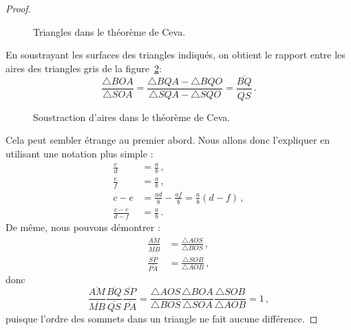 \begin{proof}
\begin{figure}[th]
\caption{Triangles dans le théorème de Ceva.}\label{f.ceva2}
\end{figure}

En soustrayant les surfaces des triangles indiqués, on obtient le rapport entre les aires des triangles gris de la figure~\ref{f.ceva3}:
\[
\frac{\triangle BOA}{\triangle SOA}=\frac{\triangle BQA - \triangle BQO}{\triangle SQA-\triangle SQO} = \frac{\overline{BQ}}{\overline{QS}}\,.
\]


\begin{figure}[htbp]
\centering

\caption{Soustraction d'aires dans le théorème de Ceva.}\label{f.ceva3}
\end{figure}

Cela peut sembler étrange au premier abord. Nous allons donc l'expliquer en utilisant une notation plus simple :
\begin{align*}
 \frac{c}{d} &=\frac{a}{b}\,,\\
 \frac{e}{f} &=\frac{a}{b}\,,\\
c-e &= \frac{ad}{b} - \frac{af}{b}=\frac{a}{b}(d-f)\,,\\
\frac{c-e}{d-f} &= \frac{a}{b}\,.
\end{align*}
De même, nous pouvons démontrer :
\begin{align*}
\frac{\overline{AM}}{\overline{MB}} &= \frac{\triangle AOS}{\triangle BOS}\,,\\
\frac{\overline{SP}}{\overline{PA}} &=\frac{\triangle SOB}{\triangle AOB}\,,
\end{align*}
donc
\[
\frac{\overline{AM}}{\overline{MB}}\frac{\overline{BQ}}{\overline{QS}}\frac{\overline{SP}}{\overline{PA}} = \frac{\triangle AOS}{\triangle BOS}\frac{\triangle BOA}{\triangle SOA}\frac{\triangle SOB}{\triangle AOB}=1\,,
\]
puisque l'ordre des sommets dans un triangle ne fait aucune différence.
\end{proof}

